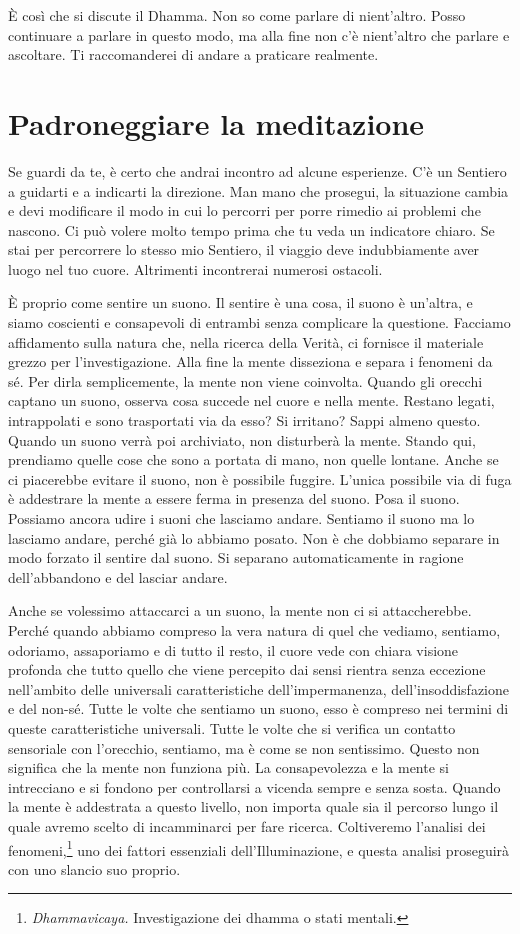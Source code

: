 È così che si discute il Dhamma. Non so come parlare di nient'altro.
Posso continuare a parlare in questo modo, ma alla fine non c'è
nient'altro che parlare e ascoltare. Ti raccomanderei di andare a
praticare realmente.

\section{Padroneggiare la meditazione}

Se guardi da te, è certo che andrai incontro ad alcune esperienze. C'è
un Sentiero a guidarti e a indicarti la direzione. Man mano che
prosegui, la situazione cambia e devi modificare il modo in cui lo
percorri per porre rimedio ai problemi che nascono. Ci può volere molto
tempo prima che tu veda un indicatore chiaro. Se stai per percorrere lo
stesso mio Sentiero, il viaggio deve indubbiamente aver luogo nel tuo
cuore. Altrimenti incontrerai numerosi ostacoli.

È proprio come sentire un suono. Il sentire è una cosa, il suono è
un'altra, e siamo coscienti e consapevoli di entrambi senza complicare
la questione. Facciamo affidamento sulla natura che, nella ricerca della
Verità, ci fornisce il materiale grezzo per l'investigazione. Alla fine
la mente disseziona e separa i fenomeni da sé. Per dirla semplicemente,
la mente non viene coinvolta. Quando gli orecchi captano un suono,
osserva cosa succede nel cuore e nella mente. Restano legati,
intrappolati e sono trasportati via da esso? Si irritano? Sappi almeno
questo. Quando un suono verrà poi archiviato, non disturberà la mente.
Stando qui, prendiamo quelle cose che sono a portata di mano, non quelle
lontane. Anche se ci piacerebbe evitare il suono, non è possibile
fuggire. L'unica possibile via di fuga è addestrare la mente a essere
ferma in presenza del suono. Posa il suono. Possiamo ancora udire i
suoni che lasciamo andare. Sentiamo il suono ma lo lasciamo andare,
perché già lo abbiamo posato. Non è che dobbiamo separare in modo
forzato il sentire dal suono. Si separano automaticamente in ragione
dell'abbandono e del lasciar andare.

Anche se volessimo attaccarci a un suono, la mente non ci si
attaccherebbe. Perché quando abbiamo compreso la vera natura di quel che
vediamo, \mbox{sentiamo}, odoriamo, assaporiamo e di tutto il resto, il cuore
vede con chiara visione profonda che tutto quello che viene percepito
dai sensi rientra senza eccezione nell'ambito delle universali
caratteristiche dell'impermanenza, dell'insoddisfazione e del non-sé.
Tutte le volte che sentiamo un suono, esso è compreso nei termini di
queste caratteristiche universali. Tutte le volte che si verifica un
contatto sensoriale con l'orecchio, sentiamo, ma è come se non
sentissimo. Questo non significa che la mente non funziona più. La
consapevolezza e la mente si intrecciano e si fondono per controllarsi a
vicenda sempre e senza sosta. Quando la mente è addestrata a questo
livello, non importa quale sia il percorso lungo il quale avremo scelto
di incamminarci per fare ricerca. Coltiveremo l'analisi dei
fenomeni,\footnote{\emph{Dhammavicaya.} Investigazione dei dhamma
  o stati mentali.} uno dei fattori essenziali dell'Illuminazione, e
questa analisi proseguirà con uno slancio suo proprio.

